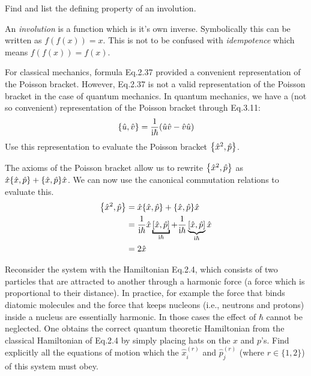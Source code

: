 \documentclass[boxes]{homework}
\makeatletter
\newcommand{\iu}{\mathrm{i}}
\numberwithin{@problem}{section}
\makeatother
\begin{document}
\setcounter{section}{3}

\begin{problem}
Find and list the defining property of an involution.
\end{problem}

\begin{solution}
	An \emph{involution} is a function which is it's own inverse. Symbolically this can be written as $f(f(x)) = x$. This is not to be confused with \emph{idempotence} which means $f(f(x)) = f(x)$.
\end{solution}

\begin{problem}
For classical mechanics, formula Eq.2.37 provided a convenient representation of the Poisson bracket. However, Eq.2.37 is not a valid representation of the Poisson bracket in the case of quantum mechanics. In quantum mechanics, we have a (not so convenient) representation of the Poisson bracket through Eq.3.11:
\begin{equation*}
	\pb{\hat{u}}{\hat{v}} = \frac{1}{\iu\hbar}\qty(\hat{u}\hat{v} - \hat{v}\hat{u})
\end{equation*}
Use this representation to evaluate the Poisson bracket $\pb{\hat{x}^2}{\hat{p}}$.
\end{problem}

\begin{solution}
	The axioms of the Poisson bracket allow us to rewrite $\pb{\hat{x}^2}{\hat{p}}$ as $\hat{x}\pb{\hat{x}}{\hat{p}} + \pb{\hat{x}}{\hat{p}}\hat{x}$. We can now use the canonical commutation relations to evaluate this.
	\begin{align*}
		\pb{\hat{x}^2}{\hat{p}} & = \hat{x}\pb{\hat{x}}{\hat{p}} + \pb{\hat{x}}{\hat{p}}\hat{x}                                                                                           \\
		                        & = \frac{1}{\iu\hbar}\hat{x}\underbracket{\comm{\hat{x}}{\hat{p}}}_{\iu\hbar} + \frac{1}{\iu\hbar}\underbrace{\comm{\hat{x}}{\hat{p}}}_{\iu\hbar}\hat{x} \\
		                        & = 2\hat{x}
	\end{align*}
\end{solution}

\begin{problem}
Reconsider the system with the Hamiltonian Eq.2.4, which consists of two particles that are attracted to another through a harmonic force (a force which is proportional to their distance). In practice, for example the force that binds diatomic molecules and the force that keeps nucleons (i.e., neutrons and protons) inside a nucleus are essentially harmonic. In those cases the effect of $\hbar$ cannot be neglected. One obtains the correct quantum theoretic Hamiltonian from the classical Hamiltonian of Eq.2.4 by simply placing hats on the $x$ and $p$’s. Find explicitly all the equations of motion which the $\hat{x}_i^{(r)}$ and $\hat{p}_j^{(r)}$ (where $r\in \{1,2\}$) of this system must obey.
\end{problem}
\end{document}
